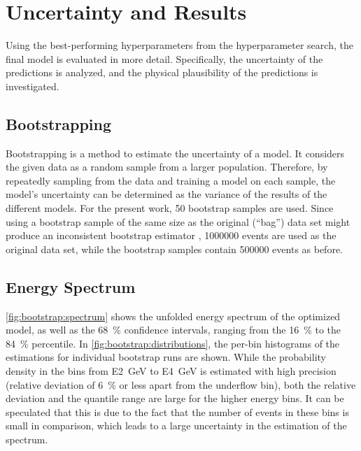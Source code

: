 \section{Uncertainty and Results}
Using the best-performing hyperparameters from the hyperparameter search, %
the final model is evaluated in more detail.
Specifically,
  the uncertainty of the predictions is analyzed, %
  and the physical plausibility of the predictions is investigated.


\subsection{Bootstrapping}
Bootstrapping \cite{bootstrap} is a method to estimate the uncertainty of a model.
It considers the given data as a random sample from a larger population.
Therefore,
by repeatedly sampling from the data and training a model on each sample,
the model's uncertainty can be determined
as the variance of the results of the different models.
%
For the present work, \num{50} bootstrap samples are used.
Since using a bootstrap sample of the same size as the original (\enquote{bag}) data set
might produce an inconsistent bootstrap estimator \cite{bootstrap_samplesize},
\num{1000000} events are used as the original data set,
while the bootstrap samples contain \num{500000} events as before.


\subsection{Energy Spectrum}
\autoref{fig:bootstrap:spectrum} shows the unfolded energy spectrum of the optimized model,
as well as the \SI{68}{\percent} confidence intervals,
  ranging from the \SI{16}{\percent} to the \SI{84}{\percent} percentile.
In \autoref{fig:bootstrap:distributions},
the per-bin histograms of the estimations for individual bootstrap runs are shown.
While the probability density in the bins from \SI{E2}{\giga\electronvolt} to \SI{E4}{\giga\electronvolt} is estimated with high precision
  (relative deviation of \SI{6}{\percent} or less apart from the underflow bin),
both the relative deviation and the quantile range are large for the higher energy bins.
It can be speculated that this is due to the fact that the number of events in these bins is small in comparison,
which leads to a large uncertainty in the estimation of the spectrum.


